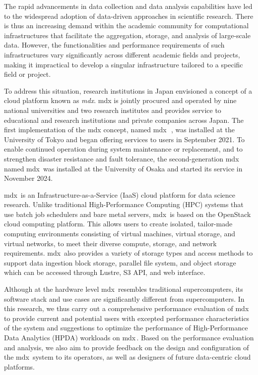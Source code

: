 \documentclass[a4paper,twoside]{article}
\newcommand{\mdx}{mdx\,\uppercase\expandafter{\romannumeral 2\relax}}
\newcommand{\mdxone}{mdx\,\uppercase\expandafter{\romannumeral 1\relax}}
\begin{document}
The rapid advancements in data collection and data analysis capabilities have led to the widespread
adoption of data-driven approaches in scientific research. There is thus an increasing demand within
the academic community for computational infrastructures that facilitate the aggregation, storage,
and analysis of large-scale data. However, the functionalities and performance requirements of such
infrastructures vary significantly across different academic fields and projects, making it
impractical to develop a singular infrastructure tailored to a specific field or project.

To address this situation, research institutions in Japan envisioned a concept of a cloud platform
known as \emph{mdx}. mdx is jointly procured and operated by nine national universities and two
research institutes and provides service to educational and research institutions and private
companies across Japan. The first implementation of the mdx concept, named
\mdxone{}~\cite{Suzumura2022}, was installed at the University of Tokyo and began offering services
to users in September 2021. To enable continued operation during system maintenance or
replacement, and to strengthen disaster resistance and fault tolerance, the second-generation mdx
named \mdx{} was installed at the University of Osaka and started its service in November 2024.

\mdx{} is an Infrastructure-as-a-Service (IaaS) cloud platform for data science research. Unlike
traditional High-Performance Computing (HPC) systems that use batch job schedulers and bare metal
servers, \mdx{} is based on the OpenStack cloud computing platform. This allows users to create
isolated, tailor-made computing environments consisting of virtual machines, virtual storage,
and virtual networks, to meet their diverse compute, storage, and network requirements.
\mdx{} also provides a variety of storage types and access methods to support data ingestion block
storage, parallel file system, and object storage which can be accessed through Lustre, S3 API, and
web interface.

Although at the hardware level \mdx{} resembles traditional supercomputers, its software stack and
use cases are significantly different from supercomputers. In this research, we thus carry out a
comprehensive performance evaluation of \mdx{} to provide current and potential users with excepted
performance characteristics of the system and suggestions to optimize the performance of
High-Performance Data Analytics (HPDA) workloads on \mdx{}. Based on the performance evaluation and
analysis, we also aim to provide feedback on the design and configuration of the \mdx{} system to
its operators, as well as designers of future data-centric cloud platforms.
\end{document}
